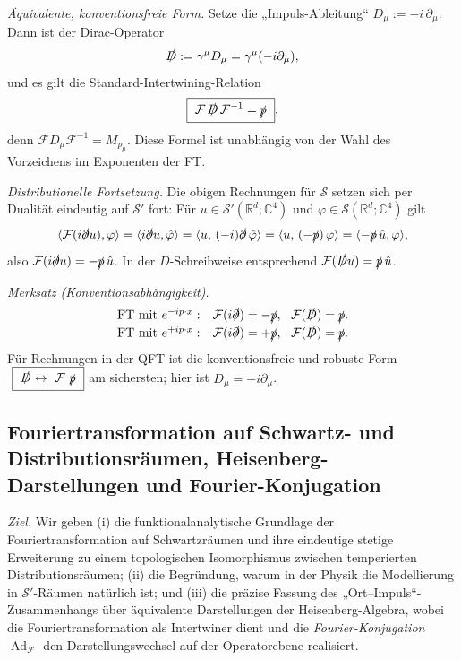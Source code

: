 \documentclass[10pt, letterpaper]{article}
\newcommand{\Ad}{\operatorname{Ad}}
\newcommand{\R}{\mathbb{R}}
\newcommand{\C}{\mathbb{C}}
\begin{document}
\emph{Äquivalente, konventionsfreie Form.}
Setze die „Impuls-Ableitung“ \(D_\mu:=-i\,\partial_\mu\).
Dann ist der Dirac-Operator
\[
\slashed{D}:=\gamma^\mu D_\mu=\gamma^\mu(-i\partial_\mu),
\]
und es gilt die Standard-Intertwining-Relation
\[
\boxed{\ \mathcal{F}\,\slashed{D}\,\mathcal{F}^{-1}=\slashed{p}\ },
\]
denn \(\mathcal{F}D_\mu\mathcal{F}^{-1}=M_{p_\mu}\).
Diese Formel ist unabhängig von der Wahl des Vorzeichens im Exponenten der FT.

\emph{Distributionelle Fortsetzung.}
Die obigen Rechnungen für \(\mathcal{S}\) setzen sich per Dualität eindeutig auf \(\mathcal{S}'\) fort:
Für \(u\in\mathcal{S}'(\R^d;\C^4)\) und \(\varphi\in\mathcal{S}(\R^d;\C^4)\) gilt
\[
\langle \mathcal{F}(i\slashed{\partial}u),\varphi\rangle
=\langle i\slashed{\partial}u,\hat\varphi\rangle
=\langle u,\,(-i)\slashed{\partial}\,\hat\varphi\rangle
=\langle u,\,(-\slashed{p})\,\varphi\rangle
=\langle -\slashed{p}\,\hat u,\varphi\rangle,
\]
also \(\mathcal{F}(i\slashed{\partial}u)=-\slashed{p}\,\hat u\).
In der \(D\)-Schreibweise entsprechend
\(\mathcal{F}(\slashed{D}u)=\slashed{p}\,\hat u\).

\emph{Merksatz (Konventionsabhängigkeit).}
\[
\begin{array}{ll}
\text{FT mit }e^{-ip\cdot x}: & \mathcal{F}(i\slashed{\partial})=-\slashed{p},\ \ \mathcal{F}(\slashed{D})=\slashed{p}.\\[2pt]
\text{FT mit }e^{+ip\cdot x}: & \mathcal{F}(i\slashed{\partial})=+\slashed{p},\ \ \mathcal{F}(\slashed{D})=\slashed{p}.
\end{array}
\]
Für Rechnungen in der QFT ist die konventionsfreie und robuste Form
\(\ \boxed{\ \slashed{D}\leftrightarrow{\ \mathcal{F}\ }\slashed{p}\ }\)
am sichersten; hier ist \(D_\mu=-i\partial_\mu\).



\subsection{Fouriertransformation auf Schwartz- und Distributionsräumen, Heisenberg-Darstellungen und Fourier-Konjugation}

\emph{Ziel.} Wir geben (i) die funktionalanalytische Grundlage der Fouriertransformation auf Schwartzräumen und ihre eindeutige stetige Erweiterung zu einem topologischen Isomorphismus zwischen temperierten Distributionsräumen; (ii) die Begründung, warum in der Physik die Modellierung in \(\mathcal{S}'\)-Räumen natürlich ist; und (iii) die präzise Fassung des „Ort–Impuls“-Zusammenhangs über äquivalente Darstellungen der Heisenberg-Algebra, wobei die Fouriertransformation als Intertwiner dient und die \emph{Fourier-Konjugation} \(\Ad_{\mathcal{F}}\) den Darstellungswechsel auf der Operatorebene realisiert.
\end{document}

